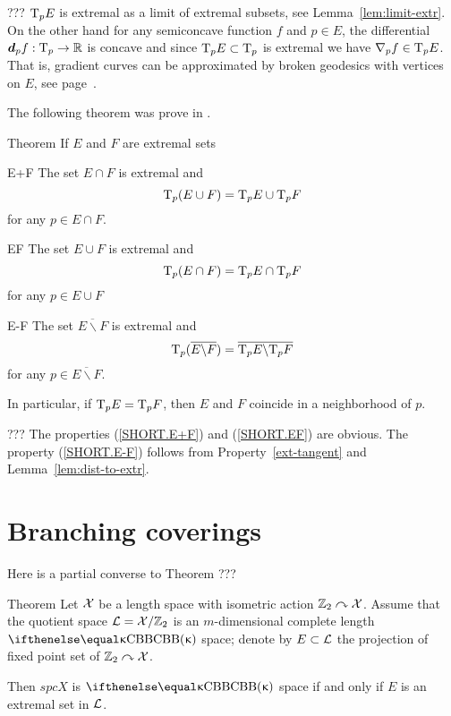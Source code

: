 ???
$\text{\rm T}_p E$ is extremal as a limit of extremal subsets, see
Lemma~\ref{lem:limit-extr}. 
On the other hand for any semiconcave function $f$ and $p\in E$, the differential $\dd_p f:\T_p\to\RR$ is concave and since $\T_p E\subset \T_p$ is extremal we have $\nabla_p f\in \T_p E$. 
That is, gradient curves can be approximated by broken
geodesics with vertices on $E$, see page~\pageref{grad-constr}.
\qeds

The following theorem was prove in \cite[3.4--5]{perelman-petrunin:extremal}.

\begin{thm}{Theorem} 
If $E$ and $F$ are extremal sets 
\begin{subthm}{E+F} The set $E\cap F$ is extremal 
and 
\[\T_p(E\cup F)=\T_p E\cup \T_p F\]
for any $p\in E\cap F$.
\end{subthm}

\begin{subthm}{EF} The set $E\cup F$  is extremal
and 
\[\T_p(E\cap F)=\T_p E\cap \T_p F\]
for any $p\in E\cup F$
\end{subthm}

\begin{subthm}{E-F} The set $\overline{E\backslash F}$ is extremal 
and 
\[\text{\rm T}_p(\overline{E\backslash
F})=\overline{\text{\rm T}_p E\backslash \text{\rm T}_p F}\]
for any $p\in \overline{E\backslash F}$.
\end{subthm}

In particular, if $\text{\rm T}_p E=\text{\rm T}_p F$, then $E$ and $F$ coincide in a neighborhood of $p$.
\end{thm}

???
 The properties (\ref{SHORT.E+F}) and (\ref{SHORT.EF}) are obvious. 
The property (\ref{SHORT.E-F}) follows from
Property~\ref{ext-tangent} and Lemma~\ref{lem:dist-to-extr}.
\qeds

\section{Branching coverings}

Here is a partial converse to Theorem ???

\begin{thm}{Theorem}
Let $\mathcal{X}$ be a length space with isometric action $\mathbb{Z}_2\curvearrowright\mathcal{X}$.
Assume that the quotient space $\mathcal{L}=\mathcal{X}/\mathbb{Z}_2$
 is an $m$-dimensional complete length $\Alex\kappa$ space; denote by $E\subset \spc{L}$ the projection of fixed point set of $\mathbb{Z}_2\curvearrowright\mathcal{X}$.

Then $spc{X}$ is $\Alex\kappa$ space if and only if $E$ is an extremal set in $\mathcal{L}$.
\end{thm}



